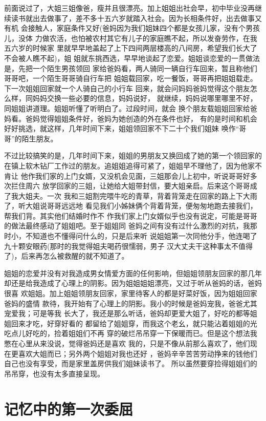 \documentclass[12pt]{book}
\begin{document}
        前面说过了，大姐三姐像爸，瘦并且很漂亮。加上姐姐出社会早，初中毕业没再继
续读书就出去做事了，差不多十五六岁就踏入社会。因为长相条件好，出去做事又有机
会接触人，家庭条件又好(爸妈因为我们姐妹四个都是女孩儿家，没有个男孩儿，没体
力做农活，也怕被农村其它有儿子的家庭瞧不起，所以发奋劳作，在我五六岁的时候家
里就早早地盖起了上下四间两层楼高的八间房，希望我们长大了不会被人瞧不起)，姐
姐就东挑西选，早早地谈起了恋爱。姐姐谈恋爱的一贯做法是，先把一个陌生男孩领回
家给爸妈看，两人骑同一辆自行车回来，暂且称他们哥哥吧，一个陌生哥哥骑自行车把
姐姐载回家，吃一餐饭，哥哥再把姐姐载走。下一次姐姐回家就一个人骑自己的小行车
回来，就会问妈妈爸妈觉得这个朋友怎么样，同妈妈交换一些必要的信息，妈妈说好，
就继续，妈妈说哪里哪里不好，同姐姐讲道理。姐姐听懂了听明白了。过段时间，就会
换个朋友载姐姐回家给爸妈看。爸妈觉得姐姐条件好，爸妈为她创造的外在条件也好，
有的是时间和机会好好挑选，就这样，几年时间下来，姐姐领回家不下二十个我们姐妹
唤作“哥哥”的陌生朋友。

        不过比较搞笑的是，几年时间下来，姐姐的男朋友又换回成了她的第一个领回家的
在镇上软木钻厂工作过的朋友。追姐姐追得可紧了，姐姐早不理他了，因为他家不肯让
他作我们家的上门女婿，又没机会见面，三姐那会儿上初中，听说哥哥好多次拦住周六
放学回家的三姐，让她给大姐带封信，要大姐亲启。后来这个哥哥成了我大姐夫。一次
我和三姐割完喂牛吃的青草，背着背笼走在回家的路上下大雨了，听大姐说哥哥远远地
看见我们小姊妹俩个背着背笼，便匆匆地跑去接我们，帮我们背。其实他们结婚时作不
作我们家上门女婿似乎也没有说定，可能是哥哥的做法最终感动了姐姐吧。至于姐姐同
爸妈之间有没有过什么激烈的对抗，我那时小，不知道也不懂得问什么的，只是后来听
说姐姐第一次同他分手，他连喝了九十颗安眼药(那时的我觉得姐夫喝药很懦弱，男子
汉大丈夫干这种事太不值得了)，后来再怎么被救醒的就不知道了。

        姐姐的恋爱并没有对我造成男女情爱方面的任何影响，但姐姐领朋友回家的那几年
却还是给我造成了心理上的阴影。因为姐姐姐姐漂亮，又过于听从爸妈的话，爸妈很喜
欢姐姐。加上姐姐领朋友回家，家里待客人的都是好菜好饭，因为姐姐回家爸妈的盛情
款待，我开始有了心理上的阴影。我小的时候是爸妈宠我，爸爸尤其宠爱我；可是等我
长大了，我还是那么听话，爸妈却更爱大姐了，好吃的都等姐姐回来才吃，好穿好看的
都留给了姐姐穿，而我这个老幺，就只能沾着姐姐的光吃点儿好吃的，捡着姐姐们不再
穿的破烂吊吊穿一下保暖而已。但是这个想法我憋在心里从来没说，觉得爸妈还是喜欢
我的，只是不像从前那么喜欢了，他们现在更喜欢大姐而已；另外两个姐姐对我也还好
，爸妈辛辛苦苦劳动挣来的钱他们自己也没有享受，而是家里盖房供我们姐妹读书了。
所以虽然要穿捡得姐姐们的吊吊穿，也没有太多直接呈现。
\section{记忆中的第一次委屈}
\label{sec-2-4}
\end{document}
